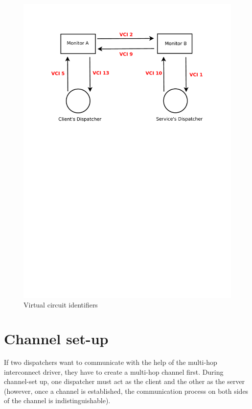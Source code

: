 \documentclass[a4paper,twoside]{report} %
\begin{document}
\begin{figure}[h]
	\begin{center}
 	\includegraphics[scale=0.68]{vcis.pdf}
 	\caption{Virtual circuit identifiers} \label{fig:vci}
 	\end{center}
\end{figure}


\section{Channel set-up}
\label{section: set-up}
If two dispatchers want to communicate with the help of the multi-hop interconnect driver, they have to create a multi-hop channel first. During channel-set up, one dispatcher must act as the client and the other as the server (however, once a channel is established, the communication process on both sides of the channel is indistinguishable). 
\end{document}
